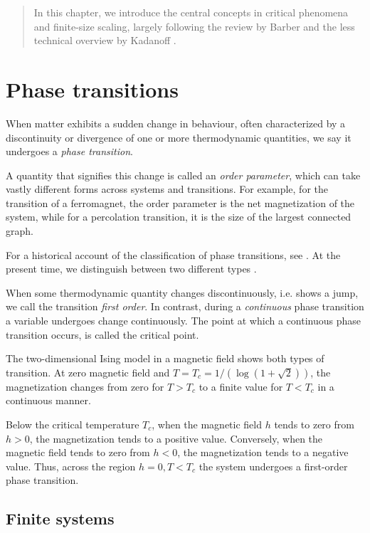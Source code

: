 \begin{abstract}
In this chapter, we introduce the central concepts in critical phenomena and finite-size scaling,
largely following the review by Barber \cite{barber1983finite} and the less technical overview by Kadanoff
\cite{kadanoff2009more}.
\end{abstract}

\section{Phase transitions}
When matter exhibits a sudden change in behaviour, often characterized by a discontinuity or divergence of one or more
thermodynamic quantities, we say it undergoes a \emph{phase transition}.

A quantity that signifies this change is called an \emph{order parameter},
which can take vastly different forms across systems and transitions.
For example, for the transition of a ferromagnet, the order parameter is the net magnetization of the system,
while for a percolation transition, it is the size of the largest connected graph.

For a historical account of the classification of phase transitions,
see \cite{jaeger1998ehrenfest}.
At the present time, we distinguish between two different types \cite{kadanoff2009more}.

When some thermodynamic quantity changes discontinuously, i.e.
shows a jump, we call the transition \emph{first order}.
In contrast, during a \emph{continuous} phase transition a variable undergoes change continuously.
The point at which a continuous phase transition occurs, is called the critical point.

The two-dimensional Ising model in a magnetic field shows both types of transition.
At zero magnetic field and $T = T_c = 1 / (\log(1 + \sqrt{2}))$, the magnetization changes from zero for $T > T_c$ to
a finite value for $T < T_c$ in a continuous manner.

Below the critical temperature $T_c$, when the magnetic field $h$ tends to zero from $h > 0$,
the magnetization tends to a positive value.
Conversely, when the magnetic field tends to zero from $h < 0$,
the magnetization tends to a negative value.
Thus, across the region $h = 0, T < T_c$ the system undergoes a first-order phase transition.

\subsection{Finite systems}

